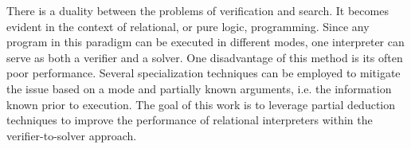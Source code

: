   There is a duality between the problems of verification and search. 
  It becomes evident in the context of relational, or pure logic, programming. 
  Since any program in this paradigm can be executed in different modes, one interpreter can serve as both a verifier and a solver. 
  One disadvantage of this method is its often poor performance. 
  Several specialization techniques can be employed to mitigate the issue based on a mode and partially known arguments, i.e. the information known prior to execution. 
  The goal of this work is to leverage partial deduction techniques to improve the performance of relational interpreters within the verifier-to-solver approach.
